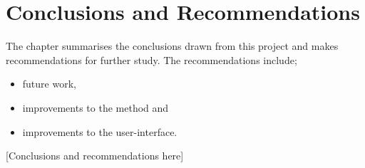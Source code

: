 \chapter{Conclusions and Recommendations}\label{chap:conclusion}
\begin{overview}
  The chapter summarises the conclusions drawn from this project and makes 
  recommendations for further study. The recommendations include;
  \begin{itemize}
    \item future work,
    \item improvements to the method and
    \item improvements to the user-interface. 
  \end{itemize}
\end{overview}

[Conclusions and recommendations here]